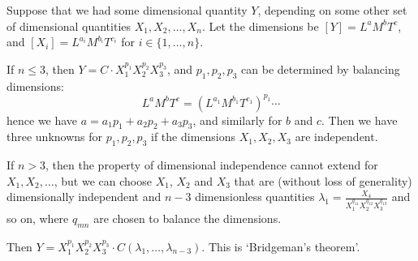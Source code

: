 \documentclass[a4paper]{scrreprt}
\begin{document}
Suppose that we had some dimensional quantity $Y$, depending on some other set of dimensional quantities $X_1, X_2, \dots, X_n$. Let the dimensions be $[Y] = L^a M^b T^c$, and $[X_i] = L^{a_i} M^{b_i} T^{c_i}$ for $i \in \{1, \dots, n\}$. 

If $n \leq 3$, then $Y = C \cdot X_1^{p_1} X_2^{p_2} X_3^{p_3}$, and $p_1, p_2, p_3$ can be determined by balancing dimensions:
$$
L^a M^b T^c = (L^{a_1} M^{b_1} T^{c_1})^{p_1} \cdots
$$
hence we have $a = a_1 p_1 + a_2 p_2 + a_3 p_3$, and similarly for $b$ and $c$. Then we have three unknowns for $p_1, p_2, p_3$ if the dimensions $X_1, X_2, X_3$ are independent.

If $n > 3$, then the property of dimensional independence cannot extend for $X_1, X_2, \dots$, but we can choose $X_1$, $X_2$ and $X_3$ that are (without loss of generality) dimensionally independent and $n - 3$ dimensionless quantities $\lambda_1 = \frac{X_4}{X_1^{q_{11}} X_2^{q_{12}} X_3^{q_{13}}}$ and so on, where $q_{mn}$ are chosen to balance the dimensions.

Then $Y = X_1^{p_1} X_2^{p_2} X_3^{p_3} \cdot C(\lambda_1, \dots, \lambda_{n - 3})$. This is `Bridgeman's theorem'. 
\end{document}

